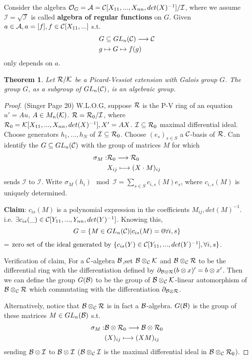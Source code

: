 \documentclass[11pt]{article}
\newtheorem{thm}{Theorem}[section]
\newcommand{\pd}{\partial}
\newcommand{\cala}{{\cal A}}
\newcommand{\calb}{{\cal B}}
\newcommand{\calc}{{\cal C}}
\newcommand{\calk}{{\cal K}}
\newcommand{\calo}{{\cal O}}
\newcommand{\calr}{{\cal R}}
\newcommand{\lrta}{\longrightarrow}
\begin{document}
Consider the algebra $\calo_G=\cala=\calc[X_{11},...,X_{nn},det(X)^{-1}]/\mathcal{I}$, where we assume $\mathcal{I}=\sqrt{\mathcal{I}}$ is called \textbf{algebra of regular functions } on $G$. Given $a\in \cala, a=[f], f\in \calc[X_{11},...]$ s.t. 
$$
\begin{aligned}
&G\subseteq GL_n(\calc)\lrta \calc\\
& g\mapsto G\mapsto f(g)
\end{aligned}
$$
only depends on $a$.


\begin{thm}
Let $\calr/\calk$ be a Picard-Vessiot extension with Galois group $G$. The group $G$, as a subgroup of $GL_n(\calc)$, is an algebraic group.
\end{thm}
\begin{proof}(Singer Page 20)
W.L.O.G, suppose $\calr$ is the P-V ring of an equation $u'=A u$, $A\in M_n(\calk)$.
$\calr=\calr_0/\mathcal{I}$, where $\calr_0=\calk[X_{11},...,X_{nn}, det(X)^{-1}], X'=AX$. $\mathcal{I}\subseteq \calr_0$ maximal differential ideal. Choose generators $h_1,...,h_N$ of $\mathcal{I}\subseteq \calr_0$. Choose $(e_s)_{s\in S} $ a $\calc$-basis of $\calr$. Can identify the $G\subseteq GL_n(\calc)$ with the group of matrices $M$ for which 
$$
\begin{aligned}
\sigma_M:&\calr_0\lrta \calr_0\\
& X_{ij}\longmapsto(X\cdot M)_{ij}
\end{aligned}
$$
sends $\mathcal{I}$ to $\mathcal{I}$. Write $\sigma_M(h_i)\mod \mathcal{I}=\sum_{s\in S}c_{i,s}(M)e_s$, where $c_{i,s}(M)$ is uniquely determined. 

\textbf{Claim}: $c_{is}(M)$ is  a polynomial expression in the coefficients $M_{ij}, det(M)^{-1}$.
i.e. $\exists c_{is}(\_)\in \calc[Y_{11},...,Y_{nn},det(Y)^{-1}]$. Knowing this,
$$
G=\{M\in GL_n(\calc)|c_{is}(M)=0\forall i,s\}
$$
= $\text{zero set of the ideal generated by $\{c_{is}(Y)\in\calc[Y_{11},...,det(Y)^{-1}],\forall i,s\}$}$.

Verification of claim, For a $\calc$-algebra $\calb$,set 
$\calb\otimes_\calc \calk $ and $\calb\otimes_\calc \calr$ to be the differential ring with the differentiation defined by $\pd_{\calb\otimes \calr}(b\otimes x)'=b\otimes x'$. Then we can define the group $G(\calb)$ to be the group of $\calb\otimes_\calc\calk$-linear automorphism of $\calb\otimes_\calc\calr$ which commutating with the differentiation $\pd_{\calb\otimes\calr}$. 

Alternatively, notice that $\calb\otimes_\calc\calr$ is in fact a $\calb$-algebra. $G(\calb)$ is the group of these matrices $M\in GL_n(\calb)$ s.t.
$$
\begin{aligned}
\sigma_M:&\calb\otimes \calr_0\lrta \calb\otimes\calr_0\\
& (X)_{ij}\longmapsto (XM)_{ij}
\end{aligned}
$$
sending $\calb\otimes \mathcal{I}$ to $\calb\otimes\mathcal{I}$ ($\calb\otimes_\calc \cal{I}$ is the maximal differential ideal in $\calb\otimes_\calc\calr_0$).


\end{proof}
\end{document}
